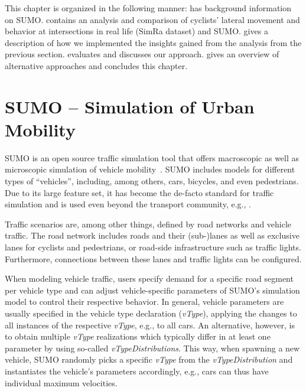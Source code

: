 This chapter is organized in the following manner:
 has background information on SUMO.
 contains an analysis and comparison of cyclists' lateral movement and behavior at intersections in real life (SimRa dataset) and SUMO.
 gives a description of how we implemented the insights gained from the analysis from the previous section.
 evaluates and  discusses our approach.
 gives an overview of alternative approaches and  concludes this chapter.

\section{SUMO -- Simulation of Urban Mobility}
\label{sec:sumo_background}
SUMO is an open source traffic simulation tool that offers macroscopic as well as microscopic simulation of vehicle mobility~\cite{lopez2018microscopic}.
SUMO includes models for different types of ``vehicles'', including, among others, cars, bicycles, and even pedestrians.
Due to its large feature set, it has become the de-facto standard for traffic simulation and is used even beyond the transport community, e.g., \cite{beilharz2021towards}.

Traffic scenarios are, among other things, defined by road networks and vehicle traffic.
The road network includes roads and their (sub-)lanes as well as exclusive lanes for cyclists and pedestrians, or road-side infrastructure such as traffic lights.
Furthermore, connections between these lanes and traffic lights can be configured.

When modeling vehicle traffic, users specify demand for a specific road segment per vehicle type and can adjust vehicle-specific parameters of SUMO's simulation model to control their respective behavior.
In general, vehicle parameters are usually specified in the vehicle type declaration (\textit{vType}), applying the changes to all instances of the respective \textit{vType}, e.g., to all cars.
An alternative, however, is to obtain multiple \textit{vType} realizations which typically differ in at least one parameter by using so-called \textit{vTypeDistributions}.
This way, when spawning a new vehicle, SUMO randomly picks a specific \textit{vType} from the \textit{vTypeDistribution} and instantiates the vehicle's parameters accordingly, e.g., cars can thus have individual maximum velocities.

